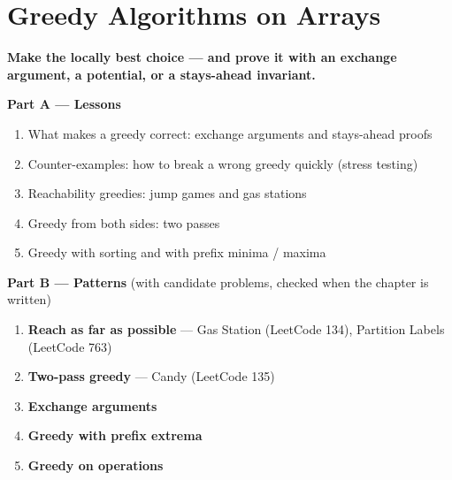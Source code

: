 \chapter{Greedy Algorithms on Arrays}
\label{ch:greedy}

\begin{tcolorbox}[enhanced, colback=white, colframe=secondaryblue, boxrule=1pt, arc=2mm]
\textbf{\large\textcolor{primaryblue}{Make the locally best choice --- and prove it with an exchange argument, a potential, or a stays-ahead invariant.}}
\end{tcolorbox}


\begin{plannedbox}
\textbf{Part A --- Lessons}
\begin{enumerate}[leftmargin=*, label=\textbf{A\arabic*.}, itemsep=1pt]
    \item What makes a greedy correct: exchange arguments and stays-ahead proofs
    \item Counter-examples: how to break a wrong greedy quickly (stress testing)
    \item Reachability greedies: jump games and gas stations
    \item Greedy from both sides: two passes
    \item Greedy with sorting and with prefix minima / maxima
\end{enumerate}
\textbf{Part B --- Patterns} (with candidate problems, checked when the chapter is written)
\begin{enumerate}[leftmargin=*, label=\textbf{P\arabic*.}, itemsep=1pt]
    \item \textbf{Reach as far as possible} --- Gas Station {\small\color{darkgray}(LeetCode 134)}, Partition Labels {\small\color{darkgray}(LeetCode 763)}
    \item \textbf{Two-pass greedy} --- Candy {\small\color{darkgray}(LeetCode 135)}
    \item \textbf{Exchange arguments}
    \item \textbf{Greedy with prefix extrema}
    \item \textbf{Greedy on operations}
\end{enumerate}
\end{plannedbox}
